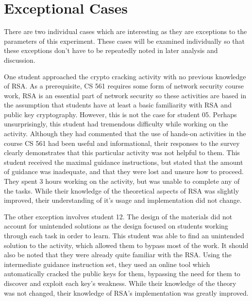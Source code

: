 


\section{Exceptional Cases}
    There are two individual cases which are interesting as they are exceptions to the parameters of this experiment. These cases will be examined individually so that these exceptions don't have to be repeatedly noted in later analysis and discussion. 

    One student approached the crypto cracking activity with no previous knowledge of RSA. As a prerequisite, CS 561 requires some form of network security course work, RSA is an essential part of network security so these activities are based in the assumption that students have at least a basic familiarity with RSA and public key cryptography. However, this is not the case for student 05. Perhaps unsurprisingly, this student had tremendous difficulty while working on the activity. Although they had commented that the use of hands-on activities in the course CS 561 had been useful and informational, their responses to the survey clearly demonstrates that this particular activity was not helpful to them. This student received the maximal guidance instructions, but stated that the amount of guidance was inadequate, and that they were lost and unsure how to proceed. They spent 3 hours working on the activity, but was unable to complete any of the tasks. While their knowledge of the theoretical aspects of RSA was slightly improved, their understanding of it's usage and implementation did not change. 

    The other exception involves student 12. The design of the materials did not account for unintended solutions as the design focused on students working through each task in order to learn. This student was able to find an unintended solution to the activity, which allowed them to bypass most of the work. It should also be noted that they were already quite familiar with the RSA. Using the intermediate guidance instruction set, they used an online tool which automatically cracked the public keys for them, bypassing the need for them to discover and exploit each key's weakness. While their knowledge of the theory was not changed, their knowledge of RSA's implementation was greatly improved.

